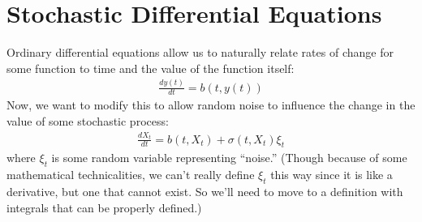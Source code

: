 \documentclass[a4paper,12pt]{article}
\theoremstyle{plain}
\theoremstyle{definition}
\theoremstyle{remark}
\begin{document}
\section{Stochastic Differential Equations}

Ordinary differential equations allow us to naturally relate rates of
change for some function to time and the value of the function itself:
\begin{align*}
  \frac{dy(t)}{dt} = b(t,y(t))
\end{align*}
Now, we want to modify this to allow random noise to influence the
change in the value of some stochastic process:
\begin{align*}
  \frac{dX_t}{dt} = b(t,X_t) + \sigma(t,X_t) \xi_t
\end{align*}
where $\xi_t$ is some random variable representing ``noise.'' (Though
because of some mathematical technicalities, we can't really define
$\xi_t$ this way since it is like a derivative, but one that cannot
exist. So we'll need to move to a definition with integrals that can be
properly defined.)



\clearpage
\end{document}
